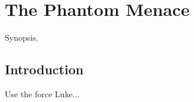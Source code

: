 
\chapter{The Phantom Menace}
	\label{chapter:phantom-menace}%



\begin{synopsis}
	Synopsis.
\end{synopsis}


\section{Introduction}

Use the force Luke...

